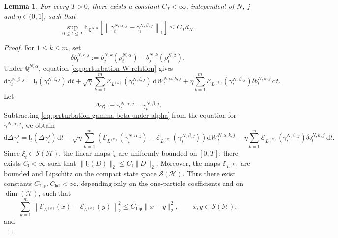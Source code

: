 \documentclass[10pt,a4paper,reqno]{amsart}
\numberwithin{equation}{section}
\theoremstyle{plain}
\newtheorem{lemma}[theorem]{Lemma}
\theoremstyle{definition}
\theoremstyle{remark}
\renewcommand{\d}{\mathrm d}
\newcommand{\E}{\mathbb E}
\newcommand{\Q}{\mathbb Q}
\newcommand{\cS}{\mathcal S}
\newcommand{\cE}{\mathcal E}
\newcommand{\HH}{\mathcal H}
\newcommand{\1}{\mathbf 1}
\begin{document}
\begin{lemma}
\label{lem:MF-comparison-final}
For every \(T>0\), there exists a constant \(C_T<\infty\), independent of
\(N\), \(j\) and \(\eta\in(0,1]\), such that
\begin{equation}
  \sup_{0\le t\le T}
  \E_{\Q^{N,\alpha}}
  \left[
    \left\|
      \gamma_t^{N,\alpha,j}
      -
      \gamma_t^{N,\beta,j}
    \right\|_1
  \right]
  \le
  C_Td_N.
  \label{eq:MF-comparison-final}
\end{equation}
\end{lemma}

\begin{proof}
For \(1\le k\le m\), set
\[
  \delta b_t^{N,k,j}:=b_j^{N,k}(\rho_t^{N,\alpha})-b_j^{N,k}(\rho_t^{N,\beta}).
\]
Under \(\Q^{N,\alpha}\), equation \eqref{eq:perturbation-W-relation} gives
\begin{equation}
  \d\gamma_t^{N,\beta,j}=\mathfrak l_t(\gamma_t^{N,\beta,j})\,\d t+\sqrt{\eta}\sum_{k=1}^m\cE_{L^{(k)}}(\gamma_t^{N,\beta,j})\,\d W_t^{N,\alpha,k,j}+\eta\sum_{k=1}^m\cE_{L^{(k)}}(\gamma_t^{N,\beta,j})\delta b_t^{N,k,j}\,\d t.
  \label{eq:perturbation-gamma-beta-under-alpha}
\end{equation}
Let
\[
  \Delta\gamma_t^j:=\gamma_t^{N,\alpha,j}-\gamma_t^{N,\beta,j}.
\]
Subtracting \eqref{eq:perturbation-gamma-beta-under-alpha} from the equation for \(\gamma^{N,\alpha,j}\), we obtain
\begin{equation}
  \d\Delta\gamma_t^j=\mathfrak l_t(\Delta\gamma_t^j)\,\d t+\sqrt{\eta}\sum_{k=1}^m\left(\cE_{L^{(k)}}(\gamma_t^{N,\alpha,j})-\cE_{L^{(k)}}(\gamma_t^{N,\beta,j})\right)\d W_t^{N,\alpha,k,j}-\eta\sum_{k=1}^m\cE_{L^{(k)}}(\gamma_t^{N,\beta,j})\delta b_t^{N,k,j}\,\d t.
  \label{eq:perturbation-D-SDE}
\end{equation}
Since \(\xi_t\in\cS(\HH)\), the linear maps \(\mathfrak l_t\) are uniformly bounded on \([0,T]\): there exists \(C_{\mathfrak l}<\infty\) such that \(\|\mathfrak l_t(D)\|_2\le C_{\mathfrak l}\|D\|_2\).  Moreover, the maps \(\cE_{L^{(k)}}\) are bounded and Lipschitz on the compact state space \(\cS(\HH)\).  Thus there exist constants \(C_{\mathrm{Lip}},C_{\mathrm{bd}}<\infty\), depending only on the one-particle coefficients and on \(\dim(\HH)\), such that
\begin{equation}
  \sum_{k=1}^m\left\|\cE_{L^{(k)}}(x)-\cE_{L^{(k)}}(y)\right\|_2^2\le C_{\mathrm{Lip}}\|x-y\|_2^2,\qquad x,y\in\cS(\HH).
  \label{eq:perturbation-E-Lipschitz}
\end{equation}
and
\begin{equation}

\end{equation}
\end{proof}
\end{document}
